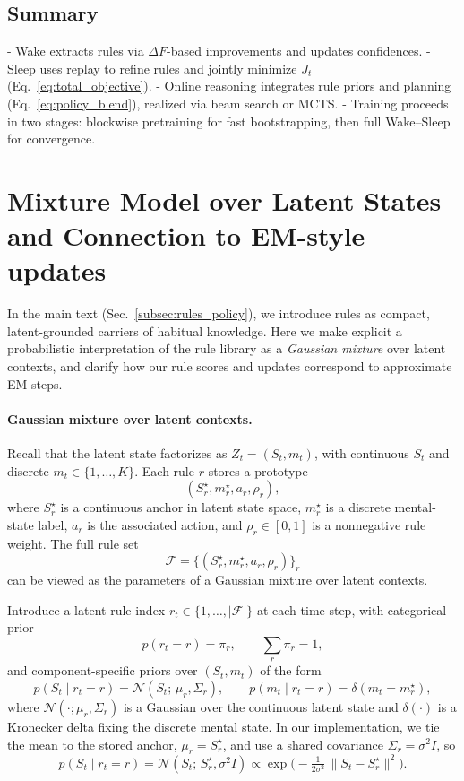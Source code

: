 \documentclass{article} %
\newcommand{\revise}[1]{#1}
\begin{document}
\subsection{Summary}
- Wake extracts rules via $\Delta F$-based improvements and updates confidences.  
- Sleep uses replay to refine rules and jointly minimize $J_t$ (Eq.~\ref{eq:total_objective}).  
- Online reasoning integrates rule priors and planning (Eq.~\ref{eq:policy_blend}), realized via beam search or MCTS.  
- Training proceeds in two stages: blockwise pretraining for fast bootstrapping, then full Wake–Sleep for convergence.
\revise{\section{Mixture Model over Latent States and Connection to EM-style updates}
\label{app:rule-mixture}
In the main text (Sec.~\ref{subsec:rules_policy}), we introduce rules as compact, latent-grounded carriers of habitual knowledge. Here we make explicit a probabilistic interpretation of the rule library as a \emph{Gaussian mixture} over latent contexts, and clarify how our rule scores and updates correspond to approximate EM steps.}
\revise{\paragraph{Gaussian mixture over latent contexts.}
Recall that the latent state factorizes as $Z_t = (S_t, m_t)$, with continuous $S_t$ and discrete $m_t \in \{1,\dots,K\}$. Each rule $r$ stores a prototype
\[
(S_r^\star, m_r^\star, a_r, \rho_r),
\]
where $S_r^\star$ is a continuous anchor in latent state space, $m_r^\star$ is a discrete mental-state label, $a_r$ is the associated action, and $\rho_r \in [0,1]$ is a nonnegative rule weight. The full rule set
\[
\mathcal{F} = \{(S_r^\star, m_r^\star, a_r, \rho_r)\}_r
\]
can be viewed as the parameters of a Gaussian mixture over latent contexts.}

\revise{Introduce a latent rule index $r_t \in \{1,\dots,|\mathcal{F}|\}$ at each time step, with categorical prior
\[
p(r_t = r) = \pi_r, \qquad \sum_r \pi_r = 1,
\]
and component-specific priors over $(S_t, m_t)$ of the form
\[
p(S_t \mid r_t = r) = \mathcal N(S_t;\,\mu_r,\Sigma_r),\qquad
p(m_t \mid r_t = r) = \delta(m_t = m_r^\star),
\]
where $\mathcal N(\cdot;\mu_r,\Sigma_r)$ is a Gaussian over the continuous latent state and $\delta(\cdot)$ is a Kronecker delta fixing the discrete mental state. In our implementation, we tie the mean to the stored anchor, $\mu_r = S_r^\star$, and use a shared covariance $\Sigma_r = \sigma^2 I$, so
\[
p(S_t \mid r_t = r)
= \mathcal N(S_t;\,S_r^\star,\sigma^2 I)
\propto \exp\!\big(-\tfrac{1}{2\sigma^2}\,\|S_t - S_r^\star\|^2\big).
\]}
\end{document}
